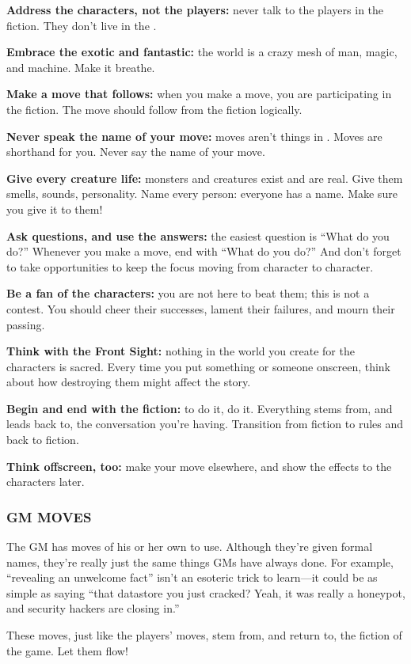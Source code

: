 \documentclass[oneside,10pt]{article}
\begin{document}
\begin{multicols}{2}
\textbf{Address the characters, not the players:} never talk to the
players in the fiction. They don’t live in the
\SW{}.

\textbf{Embrace the exotic and fantastic:} the world is a crazy
mesh of man, magic, and machine. Make it breathe.

\textbf{Make a move that follows:} when you make a move, you
are participating in the fiction. The move should follow from
the fiction logically.

\textbf{Never speak the name of your move:} moves aren’t things
in \SW{}. Moves are shorthand for you. Never say the
name of your move.

\textbf{Give every creature life:} monsters and creatures exist and
are real. Give them smells, sounds, personality.
Name every person: everyone has a name. Make sure you
give it to them!

\textbf{Ask questions, and use the answers:} the easiest question
is “What do you do?” Whenever you make a move, end
with “What do you do?” And don’t forget to take opportunities to keep the focus moving from character to
character.

\textbf{Be a fan of the characters:} you are not here to beat them;
this is not a contest. You should cheer their successes,
lament their failures, and mourn their passing.

\textbf{Think with the Front Sight:} nothing in the world you create
for the characters is sacred. Every time you put something
or someone onscreen, think about how destroying them
might affect the story.

\textbf{Begin and end with the fiction:} to do it, do it. Everything
stems from, and leads back to, the conversation you’re having. Transition from fiction to rules and back to
fiction.

\textbf{Think offscreen, too:} make your move elsewhere, and
show the effects to the characters later.

\subsubsection{GM MOVES}
The GM has moves of his or her own to use. Although they’re
given formal names, they’re really just the same things GMs
have always done. For example, “revealing an unwelcome
fact” isn’t an esoteric trick to learn—it could be as simple as
saying “that datastore you just cracked? Yeah, it was really a
honeypot, and security hackers are closing in.”

These moves, just like the players’ moves, stem from, and
return to, the fiction of the game. Let them flow!


\end{multicols}
\end{document}
